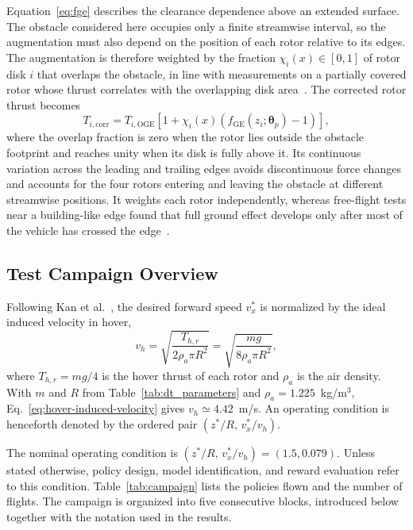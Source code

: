 \documentclass[journal]{IEEEtran}
\begin{document}
Equation~\eqref{eq:fge} describes the clearance dependence above an extended surface. The obstacle considered here occupies only a finite streamwise interval, so the augmentation must also depend on the position of each rotor relative to its edges. The augmentation is therefore weighted by the fraction $\chi_i(x)\in[0,1]$ of rotor disk $i$ that overlaps the obstacle, in line with measurements on a partially covered rotor whose thrust correlates with the overlapping disk area~\cite{Yon2026}. The corrected rotor thrust becomes
\begin{equation}
 T_{i,\mathrm{corr}}=T_{i,\mathrm{OGE}}\left[1+\chi_i(x)\left(f_{\mathrm{GE}}(z_i;\boldsymbol{\theta}_p)-1\right)\right],
 \label{eq:corrected-thrust}
\end{equation}
where the overlap fraction is zero when the rotor lies outside the obstacle footprint and reaches unity when its disk is fully above it. Its continuous variation across the leading and trailing edges avoids discontinuous force changes and accounts for the four rotors entering and leaving the obstacle at different streamwise positions. It weights each rotor independently, whereas free-flight tests near a building-like edge found that full ground effect develops only after most of the vehicle has crossed the edge~\cite{Herz2026}. 

\subsection{Test Campaign Overview}
\label{sec:test-campaign}
Following Kan et al.~\cite{Kan2019}, the desired forward speed $v_x^\ast$ is normalized by the ideal induced velocity in hover,
\begin{equation}
 v_h=\sqrt{\frac{T_{h,r}}{2\rho_a\pi R^2}}
 =\sqrt{\frac{mg}{8\rho_a\pi R^2}},
 \label{eq:hover-induced-velocity}
\end{equation}
where $T_{h,r}=mg/4$ is the hover thrust of each rotor and $\rho_a$ is the air density. With $m$ and $R$ from Table~\ref{tab:dt_parameters} and $\rho_a=1.225$~kg/m$^3$, Eq.~\eqref{eq:hover-induced-velocity} gives $v_h\simeq4.42$~m/s. An operating condition is henceforth denoted by the ordered pair $(z^\ast/R,\,v_x^\ast/v_h)$.

The nominal operating condition is $(z^\ast/R,\,v_x^\ast/v_h)=(1.5,0.079)$. Unless stated otherwise, policy design, model identification, and reward evaluation refer to this condition. Table~\ref{tab:campaign} lists the policies flown and the number of flights. The campaign is organized into five consecutive blocks, introduced below together with the notation used in the results.
\end{document}

